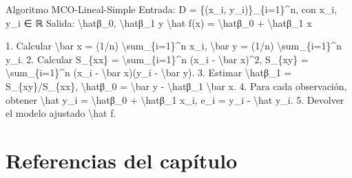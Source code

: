 \documentclass[
  spanish,
  10.5pt,
  letterpaper,
  DIV=11,
  numbers=noendperiod,
  oneside,
  open=any]{scrreprt}
\newenvironment{Shaded}{\begin{snugshade}}{\end{snugshade}}
\newcommand{\NormalTok}[1]{\textcolor[rgb]{0.00,0.23,0.31}{#1}}
\theoremstyle{definition}
\theoremstyle{definition}
\theoremstyle{plain}
\theoremstyle{remark}
\begin{document}
\begin{tcolorbox}[enhanced jigsaw, arc=.35mm, bottomrule=.15mm, bottomtitle=1mm, breakable, colback=white, colbacktitle=quarto-callout-note-color!10!white, colframe=quarto-callout-note-color-frame, coltitle=black, left=2mm, leftrule=.75mm, opacityback=0, opacitybacktitle=0.6, rightrule=.15mm, title=\textcolor{quarto-callout-note-color}{\faInfo}\hspace{0.5em}{Seudocódigo matemático formal}, titlerule=0mm, toprule=.15mm, toptitle=1mm]

\begin{Shaded}
\begin{Highlighting}[numbers=left,,]
\NormalTok{Algoritmo MCO{-}Lineal{-}Simple}
\NormalTok{Entrada:}
\NormalTok{  D = \{(x\_i, y\_i)\}\_\{i=1\}\^{}n, con x\_i, y\_i ∈ ℝ}
\NormalTok{Salida:}
\NormalTok{  \textbackslash{}hatβ\_0, \textbackslash{}hatβ\_1 y \textbackslash{}hat f(x) = \textbackslash{}hatβ\_0 + \textbackslash{}hatβ\_1 x}

\NormalTok{1. Calcular}
\NormalTok{      \textbackslash{}bar x = (1/n) \textbackslash{}sum\_\{i=1\}\^{}n x\_i,}
\NormalTok{      \textbackslash{}bar y = (1/n) \textbackslash{}sum\_\{i=1\}\^{}n y\_i.}
\NormalTok{2. Calcular}
\NormalTok{      S\_\{xx\} = \textbackslash{}sum\_\{i=1\}\^{}n (x\_i {-} \textbackslash{}bar x)\^{}2,}
\NormalTok{      S\_\{xy\} = \textbackslash{}sum\_\{i=1\}\^{}n (x\_i {-} \textbackslash{}bar x)(y\_i {-} \textbackslash{}bar y).}
\NormalTok{3. Estimar}
\NormalTok{      \textbackslash{}hatβ\_1 = S\_\{xy\}/S\_\{xx\},}
\NormalTok{      \textbackslash{}hatβ\_0 = \textbackslash{}bar y {-} \textbackslash{}hatβ\_1 \textbackslash{}bar x.}
\NormalTok{4. Para cada observación, obtener}
\NormalTok{      \textbackslash{}hat y\_i = \textbackslash{}hatβ\_0 + \textbackslash{}hatβ\_1 x\_i,}
\NormalTok{      e\_i = y\_i {-} \textbackslash{}hat y\_i.}
\NormalTok{5. Devolver el modelo ajustado \textbackslash{}hat f.}
\end{Highlighting}
\end{Shaded}

\end{tcolorbox}

\section*{Referencias del capítulo}\label{referencias-del-capuxedtulo-8}

\end{document}
